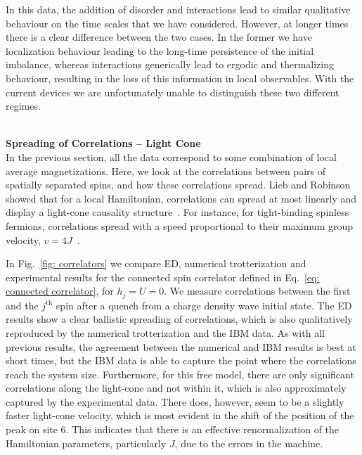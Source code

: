 \documentclass[twocolumn,showpacs,preprintnumbers,nofootinbib,amsmath,aps,pra,longbibliography,amssymb,superscriptaddress]{revtex4-1}
\begin{document}
In this data, the addition of disorder and interactions lead to similar qualitative behaviour on the time scales that we have considered. However, at longer times there is a clear difference between the two cases. In the former we have localization behaviour leading to the long-time persistence of the initial imbalance, whereas interactions generically lead to ergodic and thermalizing behaviour, resulting in the loss of this information in local observables. With the current devices we are unfortunately unable to distinguish these two different regimes. 






\hfill\\\textbf{Spreading of Correlations -- Light Cone}\\
In the previous section, all the data correspond to some combination of local average magnetizations. Here, we look at the correlations between pairs of spatially separated spins, and how these correlations spread. Lieb and Robinson showed that for a local Hamiltonian, correlations can spread at most linearly and display a light-cone causality structure~\cite{Lieb1972}. For instance, for tight-binding spinless fermions, correlations spread with a speed proportional to their maximum group velocity, $v=4J$~\cite{Essler2016}.

In Fig.~\ref{fig: correlators} we compare ED, numerical trotterization and experimental results for the connected spin correlator defined in Eq.~\eqref{eq: connected correlator}, for $h_j = U = 0$. We measure correlations between the first and the $j^\text{th}$ spin after a quench from a charge density wave initial state. The ED results show a clear ballistic spreading of correlations, which is also qualitatively reproduced by the numerical trotterization and the IBM data. As with all previous results, the agreement between the numerical and IBM results is best at short times, but the IBM data is able to capture the point where the correlations reach the system size. Furthermore, for this free model, there are only significant correlations along the light-cone and not within it, which is also approximately captured by the experimental data. There does, however, seem to be a slightly faster light-cone velocity, which is most evident in the shift of the position of the peak on site 6. This indicates that there is an effective renormalization of the Hamiltonian parameters, particularly $J$, due to the errors in the machine.
\end{document}
